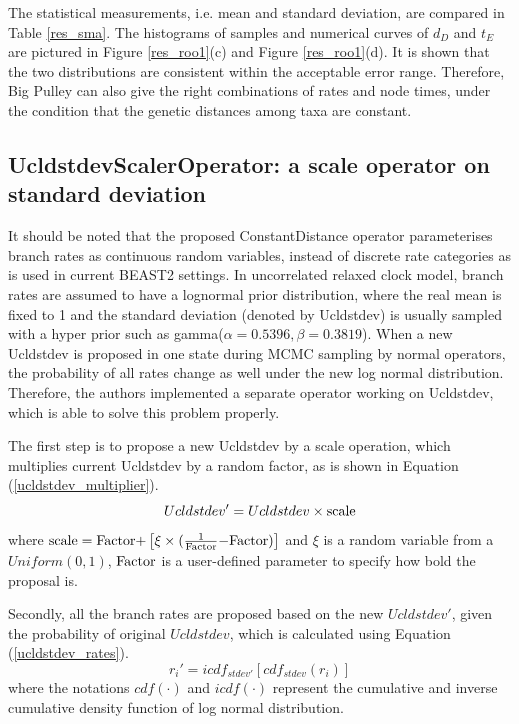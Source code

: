 \documentclass{bmcart}
\begin{document}
\begin{backmatter}
The statistical measurements, i.e. mean and standard deviation, are compared in Table \ref{res_sma}. The histograms of samples and numerical curves of ${d_D}$ and ${t_E}$ are pictured in Figure \ref{res_roo1}(c) and Figure \ref{res_roo1}(d). It is shown that the two distributions are consistent within the acceptable error range. Therefore, Big Pulley can also give the right combinations of rates and node times, under the condition that the genetic distances among taxa are constant.

\subsection*{UcldstdevScalerOperator: a scale operator on standard deviation}
It should be noted that the proposed ConstantDistance operator parameterises branch rates as continuous random variables, instead of discrete rate categories as is used in current BEAST2 settings. In uncorrelated relaxed clock model, branch rates are assumed to have a lognormal prior distribution, where the real mean is fixed to 1 and the standard deviation (denoted by Ucldstdev) is usually sampled with a hyper prior such as gamma($\alpha = 0.5396, \beta = 0.3819$). When a new Ucldstdev is proposed in one state during MCMC sampling by normal operators, the probability of all rates change as well under the new log normal distribution. Therefore, the authors implemented a separate operator working on Ucldstdev, which is able to solve this problem properly. 

The first step is to propose a new Ucldstdev by a scale operation, which multiplies  current Ucldstdev by a random factor, as is shown in Equation (\ref{ucldstdev_multiplier}).
\begin{equation}\label{ucldstdev_multiplier}
Ucldstdev' = Ucldstdev \times {\rm{scale}}
\end{equation}
where ${\rm{scale = Factor  +  }}\left[ {\xi  \times {\rm{(}}\frac{1}{{{\rm{Factor}}}}{\rm{  -  Factor)}}} \right]$ and  $\xi$ is a random variable from a $Uniform(0,1)$,  ${\rm{Factor}}$ is a user-defined parameter to specify how bold the proposal is.

Secondly, all the branch rates are proposed based on the new $Ucldstdev'$, given the probability of original $Ucldstdev$, which is calculated using Equation (\ref{ucldstdev_rates}).
\begin{equation}\label{ucldstdev_rates}
r_{i}' = icd{f_{stdev'}}\left[ {cd{f_{stdev}}({r_i})} \right]
\end{equation}
where the notations $cdf(\cdot)$ and $icdf(\cdot)$ represent the cumulative and inverse cumulative density function of log normal distribution.


\end{backmatter}
\end{document}
